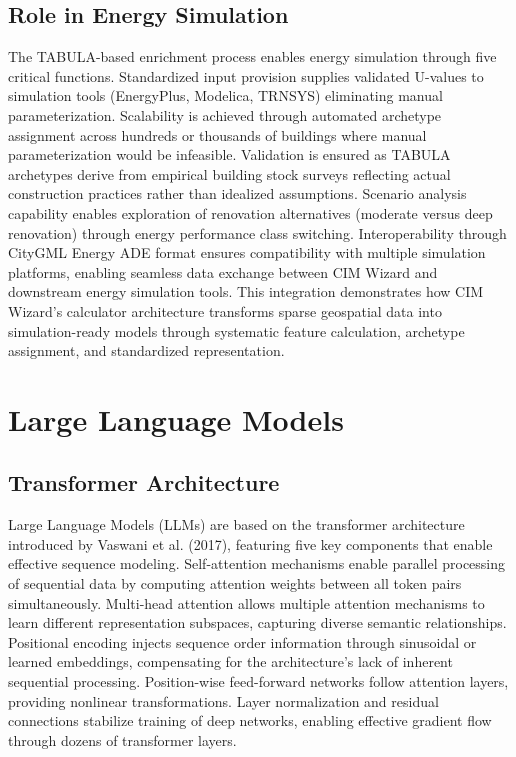 \subsection{Role in Energy Simulation}

The TABULA-based enrichment process enables energy simulation through five critical functions. Standardized input provision supplies validated U-values to simulation tools (EnergyPlus, Modelica, TRNSYS) eliminating manual parameterization. Scalability is achieved through automated archetype assignment across hundreds or thousands of buildings where manual parameterization would be infeasible. Validation is ensured as TABULA archetypes derive from empirical building stock surveys reflecting actual construction practices rather than idealized assumptions. Scenario analysis capability enables exploration of renovation alternatives (moderate versus deep renovation) through energy performance class switching. Interoperability through CityGML Energy ADE format ensures compatibility with multiple simulation platforms, enabling seamless data exchange between CIM Wizard and downstream energy simulation tools. This integration demonstrates how CIM Wizard's calculator architecture transforms sparse geospatial data into simulation-ready models through systematic feature calculation, archetype assignment, and standardized representation. 



\section{Large Language Models}

\subsection{Transformer Architecture}

Large Language Models (LLMs) are based on the transformer architecture~\cite{vaswani2017attention} introduced by Vaswani et al. (2017), featuring five key components that enable effective sequence modeling. Self-attention mechanisms enable parallel processing of sequential data by computing attention weights between all token pairs simultaneously. Multi-head attention allows multiple attention mechanisms to learn different representation subspaces, capturing diverse semantic relationships. Positional encoding injects sequence order information through sinusoidal or learned embeddings, compensating for the architecture's lack of inherent sequential processing. Position-wise feed-forward networks follow attention layers, providing nonlinear transformations. Layer normalization and residual connections stabilize training of deep networks, enabling effective gradient flow through dozens of transformer layers.

